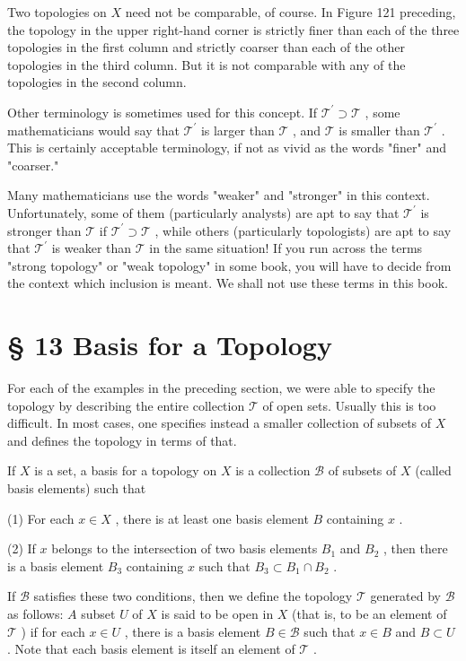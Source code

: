 Two topologies on \(X\) need not be comparable, of course. In Figure 121 preceding, the topology in the upper right-hand corner is strictly finer than each of the three topologies in the first column and strictly coarser than each of the other topologies in the third column. But it is not comparable with any of the topologies in the second column.

Other terminology is sometimes used for this concept. If \({\mathcal{T}}^{\prime } \supset  \mathcal{T}\) , some mathematicians would say that \({\mathcal{T}}^{\prime }\) is larger than \(\mathcal{T}\) , and \(\mathcal{T}\) is smaller than \({\mathcal{T}}^{\prime }\) . This is certainly acceptable terminology, if not as vivid as the words "finer" and "coarser."

Many mathematicians use the words "weaker" and "stronger" in this context. Unfortunately, some of them (particularly analysts) are apt to say that \({\mathcal{T}}^{\prime }\) is stronger than \(\mathcal{T}\) if \({\mathcal{T}}^{\prime } \supset  \mathcal{T}\) , while others (particularly topologists) are apt to say that \({\mathcal{T}}^{\prime }\) is weaker than \(\mathcal{T}\) in the same situation! If you run across the terms "strong topology" or "weak topology" in some book, you will have to decide from the context which inclusion is meant. We shall not use these terms in this book.

\section*{§ 13 Basis for a Topology}

For each of the examples in the preceding section, we were able to specify the topology by describing the entire collection \(\mathcal{T}\) of open sets. Usually this is too difficult. In most cases, one specifies instead a smaller collection of subsets of \(X\) and defines the topology in terms of that.

\begin{definition} If \(X\) is a set, a basis for a topology on \(X\) is a collection \(\mathcal{B}\) of subsets of \(X\) (called basis elements) such that

(1) For each \(x \in  X\) , there is at least one basis element \(B\) containing \(x\) .

(2) If \(x\) belongs to the intersection of two basis elements \({B}_{1}\) and \({B}_{2}\) , then there is a basis element \({B}_{3}\) containing \(x\) such that \({B}_{3} \subset  {B}_{1} \cap  {B}_{2}\) .

If \(\mathcal{B}\) satisfies these two conditions, then we define the topology \(\mathcal{T}\) generated by \(\mathcal{B}\) as follows: \(A\) subset \(U\) of \(X\) is said to be open in \(X\) (that is, to be an element of \(\mathcal{T}\) ) if for each \(x \in  U\) , there is a basis element \(B \in  \mathcal{B}\) such that \(x \in  B\) and \(B \subset  U\) . Note that each basis element is itself an element of \(\mathcal{T}\) .
\end{definition}

